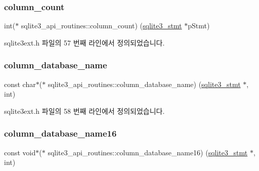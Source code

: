 \subsubsection{\texorpdfstring{column\+\_\+count}{column\_count}}
{\footnotesize\ttfamily int($\ast$ sqlite3\+\_\+api\+\_\+routines\+::column\+\_\+count) (\hyperlink{sqlite3_8h_af2a033da1327cdd77f0a174a09aedd0c}{sqlite3\+\_\+stmt} $\ast$p\+Stmt)}



sqlite3ext.\+h 파일의 57 번째 라인에서 정의되었습니다.

\mbox{\label{structsqlite3__api__routines_acd92d7b8700122a8c352d9f03c8fad37}} 
\subsubsection{\texorpdfstring{column\+\_\+database\+\_\+name}{column\_database\_name}}
{\footnotesize\ttfamily const char$\ast$($\ast$ sqlite3\+\_\+api\+\_\+routines\+::column\+\_\+database\+\_\+name) (\hyperlink{sqlite3_8h_af2a033da1327cdd77f0a174a09aedd0c}{sqlite3\+\_\+stmt} $\ast$, int)}



sqlite3ext.\+h 파일의 58 번째 라인에서 정의되었습니다.

\mbox{\label{structsqlite3__api__routines_a3e38edb955dbd932717bb11283b65490}} 
\subsubsection{\texorpdfstring{column\+\_\+database\+\_\+name16}{column\_database\_name16}}
{\footnotesize\ttfamily const void$\ast$($\ast$ sqlite3\+\_\+api\+\_\+routines\+::column\+\_\+database\+\_\+name16) (\hyperlink{sqlite3_8h_af2a033da1327cdd77f0a174a09aedd0c}{sqlite3\+\_\+stmt} $\ast$, int)}



